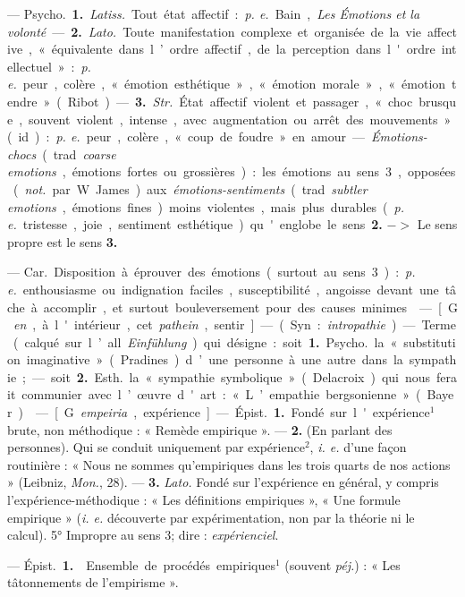 \begin{itemize}[leftmargin=1cm, label=, itemsep=1pt]
 — \si{Psycho.} {\bf 1.} {\it Latiss.} Tout
état affectif : {\it p. e.} Bain, {\it Les Émotions
et la volonté}. — {\bf 2.} {\it Lato.} Toute manifestation complexe et organisée de la vie affective, « équivalente
dans l’ordre affectif, de la perception dans l'ordre intellectuel » :
{\it p. e.} peur, colère, « émotion esthétique », « émotion morale », « émotion tendre » (Ribot). — {\bf 3.} {\it Str.}
État affectif violent et passager,
« choc brusque, souvent violent,
intense, avec augmentation ou arrêt
des mouvements » (id.) : {\it p. e.} peur,
colère, « coup de foudre » en amour.
— {\it Émotions-chocs} (trad. {\it coarse emotions}, émotions fortes
ou grossières) : les émotions au sens 3, opposées
({\it not.} par W. James) aux {\it émotions-sentiments} (trad.
{\it subtler emotions}, émotions fines) moins violentes,
mais plus durables ({\it p. e.} tristesse,
joie, sentiment esthétique) qu'englobe le sens {\bf 2.} $->$ Le sens propre
est le sens {\bf 3.}

 — \si{Car.} Disposition à
éprouver des émotions (surtout au sens 3) : {\it p. e.} enthousiasme ou
indignation faciles, susceptibilité, angoisse devant une tâche à
accomplir, et surtout bouleversement pour des causes minimes.

 — [G. {\it en}, à l'intérieur, cet
{\it pathein}, sentir] — (Syn. : {\it intropathie}).
— Terme (calqué sur l’all. {\it Einfühlung}) qui désigne : soit
{\bf 1.} \si{Psycho.} la
« substitution imaginative » (Pradines) d’une personne à une autre
dans la sympathie; — soit {\bf 2.} \si{Esth.}
la « sympathie symbolique » (Delacroix) qui nous ferait communier
avec l’œuvre d'art : « L’empathie
bergsonienne » (Bayer).

 — [G. {\it empeiria}, expérience]
— \si{Épist.} {\bf 1.} Fondé sur l'expérience$^1$
brute, non méthodique : « Remède empirique ». — {\bf 2.} (En parlant des
personnes). Qui se conduit uniquement par expérience$^2$, {\it i. e.} d'une
façon routinière : « Nous ne sommes qu’empiriques dans les trois quarts
de nos actions » (Leibniz, {\it Mon.}, 28).
— {\bf 3.} {\it Lato.} Fondé sur l'expérience
en général, y compris l’expérience-méthodique : « Les définitions
empiriques », « Une formule empirique » ({\it i. e.} découverte par
expérimentation, non par la théorie ni le
calcul). 5° Impropre au sens 3; dire : {\it expérienciel}.

 — \si{Épist.} {\bf 1.}  Ensemble de
procédés empiriques$^1$ (souvent  {\it péj.}) :
« Les tâtonnements de l’empirisme ».


\end{itemize}
